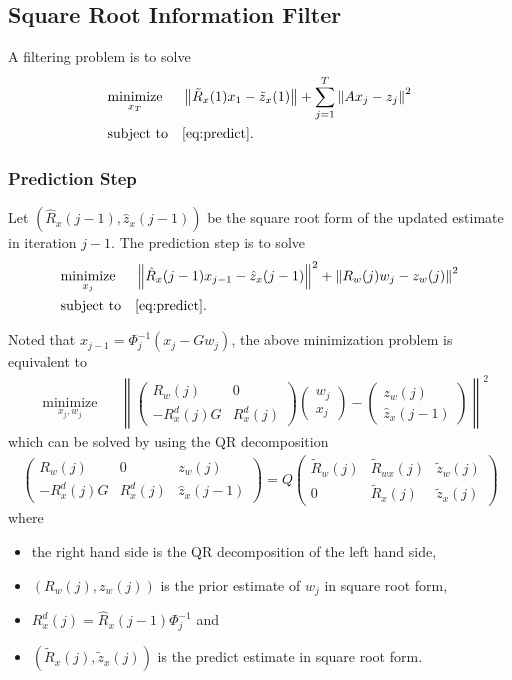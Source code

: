 \documentclass[microtype]{gtpart}     %
\theoremstyle{definition}
\newcommand{\norm}[1]{\left\lVert#1\right\rVert}
\begin{document}
\subsection{Square Root Information Filter}

A filtering problem is to solve
\begin{align*}
& \underset{x_T}{\text{minimize}} & & \norm{\tilde{R}_x(1)x_1 - \tilde{z}_x(1)} + \sum_{j=1}^{T}\norm{Ax_j - z_j}^2 \\
& \text{subject to} & & \autoref{eq:predict}.
\end{align*}

\subsubsection{Prediction Step}

Let $(\hat{R}_x(j-1), \hat{z}_x(j-1))$ be the square root form of the updated estimate in iteration $j-1$.
The prediction step is to solve
\begin{align*}
	& \underset{x_j}{\text{minimize}} & &\norm{\hat{R}_x(j-1)x_{j-1} - \hat{z}_x(j-1)}^2 + \norm{R_w(j)w_j - z_w(j)}^2 \\
	& \text{subject to} & & \autoref{eq:predict}.
\end{align*}

Noted that $x_{j-1} = \Phi^{-1}_j(x_j - Gw_j)$, the above minimization problem is equivalent to
\begin{align*}
	& \underset{x_j, w_j}{\text{minimize}} & &\norm{
		\begin{pmatrix}
		R_w(j) &0 \\
		-R^d_x(j)G &R^d_x(j)
		\end{pmatrix}
		\begin{pmatrix}
		w_j \\ x_j
		\end{pmatrix} - \begin{pmatrix}
		z_w(j) \\ \hat{z}_x(j-1)
		\end{pmatrix}}^2
\end{align*}
which can be solved by using the QR decomposition
\begin{align*}
	\begin{pmatrix}
		R_w(j) &0 &z_w(j) \\ 
		-R^d_x(j)G &R^d_x(j) &\hat{z}_x(j-1)
	\end{pmatrix} = Q
	\begin{pmatrix}
		\tilde{R}_w(j) &\tilde{R}_{wx}(j) &\tilde{z}_w(j) \\ 0 &\tilde{R}_x(j) &\tilde{z}_x(j)
	\end{pmatrix}
\end{align*}
where
\begin{itemize}
	\item the right hand side is the QR decomposition of the left hand side,
	\item $(R_w(j), z_w(j))$ is the prior estimate of $w_j$ in square root form,
	\item $R^d_x(j)=\hat{R}_x(j-1)\Phi^{-1}_j$ and
	\item $(\tilde{R}_x(j), \tilde{z}_x(j))$ is the predict estimate in square root form.
\end{itemize}
\end{document}
